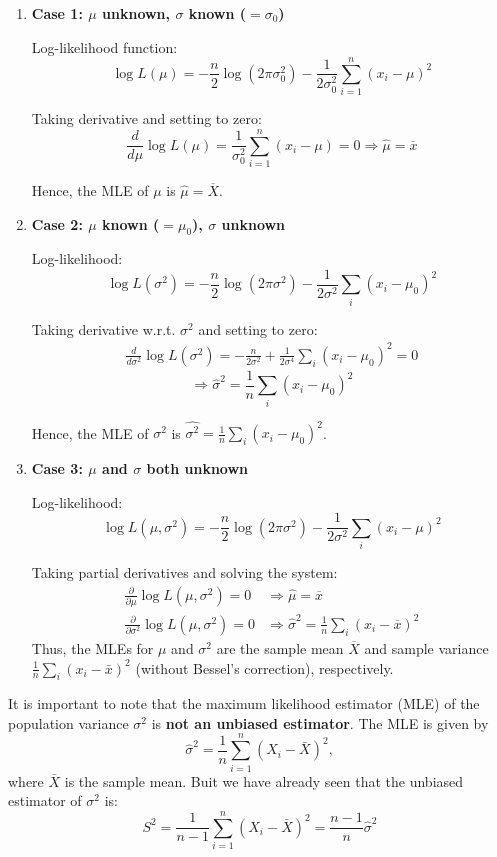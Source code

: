 \documentclass[twoside]{book}
\begin{document}
\begin{enumerate}[label=(\roman*)]
\item \textbf{Case 1: \( \mu \) unknown, \( \sigma \) known ($=\sigma_0$)}

Log-likelihood function:
\[
\log L(\mu) = -\frac{n}{2} \log(2\pi\sigma_0^2) - \frac{1}{2\sigma_0^2} \sum_{i=1}^n (x_i - \mu)^2
\]

Taking derivative and setting to zero:
\[
\frac{d}{d\mu}\log L(\mu) = \frac{1}{\sigma_0^2} \sum_{i=1}^n (x_i - \mu) = 0 \Rightarrow \hat{\mu} = \overline{x}
\]

Hence, the MLE of $\mu$ is $\hat{\mu} = \overline{X}$.

\item \textbf{Case 2: \( \mu \) known ($=\mu_0$), \( \sigma \) unknown}

Log-likelihood:
\[
\log L(\sigma^2) = -\frac{n}{2} \log(2\pi\sigma^2) - \frac{1}{2\sigma^2} \sum_i (x_i - \mu_0)^2
\]

Taking derivative w.r.t. \( \sigma^2 \) and setting to zero:
\begin{align*}
\frac{d}{d\sigma^2}\log L(\sigma^2) = -\frac{n}{2\sigma^2}+\frac{1}{2\sigma^4}\sum_i (x_i - \mu_0)^2= 0
\end{align*}
\[
\Rightarrow \hat{\sigma}^2 = \frac{1}{n} \sum_i (x_i - \mu_0)^2
\]

Hence, the MLE of $\sigma^2$ is $\hat{\sigma^2} = \frac{1}{n} \sum_i (x_i - \mu_0)^2$.

\item \textbf{Case 3: \( \mu \) and \( \sigma \) both unknown}

Log-likelihood:
\[
\log L(\mu,\sigma^2) = -\frac{n}{2} \log(2\pi\sigma^2) - \frac{1}{2\sigma^2} \sum_i (x_i - \mu)^2
\]

Taking partial derivatives and solving the system:
\begin{align*}
\frac{\partial}{\partial \mu} \log L(\mu,\sigma^2) = 0 &\Rightarrow \hat{\mu} = \overline{x} \\
\frac{\partial}{\partial \sigma^2} \log L(\mu,\sigma^2) = 0 &\Rightarrow \hat{\sigma}^2 = \frac{1}{n} \sum_i (x_i - \overline{x})^2
\end{align*}
Thus, the MLEs for \( \mu \) and \( \sigma^2 \) are the sample mean $\overline{X}$ and sample variance $\frac{1}{n} \sum_i (x_i - \bar{x})^2$ (without Bessel's correction), respectively.

\end{enumerate}

It is important to note that the maximum likelihood estimator (MLE) of the population variance \( \sigma^2 \) is \textbf{not an unbiased estimator}. The MLE is given by
\[
\hat{\sigma}^2 = \frac{1}{n} \sum_{i=1}^n (X_i - \bar{X})^2,
\]
where \( \bar{X} \) is the sample mean. Buit we have already seen that the unbiased estimator of $\sigma^2$ is:
\[
S^2 = \frac{1}{n-1} \sum_{i=1}^n (X_i - \bar{X})^2 = \frac{n-1}{n}\hat{\sigma}^2
\]
\end{document}
